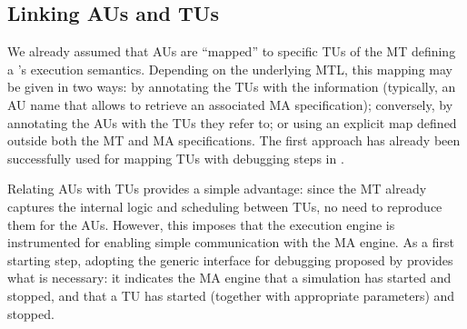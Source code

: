 \subsection{Linking AUs and TUs}
\label{sec:AUTU}

We already assumed that AUs are ``mapped'' to specific TUs of the MT defining
a \DSL's execution semantics. Depending on the underlying MTL, this mapping may
be given in two ways: by annotating the TUs with the information (typically,
an AU name that allows to retrieve an associated MA specification); conversely,
by annotating the AUs with the TUs they refer to; or using an explicit map
defined outside both the MT and MA specifications. The first approach has already
been successfully used for mapping TUs with debugging steps in \cite{bousse2018omniscient}.

Relating AUs with TUs provides a simple advantage: since the MT already captures
the internal logic and scheduling between TUs, no need to reproduce them for the
AUs. However, this imposes that the execution engine is instrumented for enabling
simple communication with the MA engine. As a first starting step, adopting the 
generic interface for debugging proposed by \citet{bousse2018omniscient} provides
what is necessary: it indicates the MA engine that a simulation has started and
stopped, and that a TU has started (together with appropriate parameters) and 
stopped.
